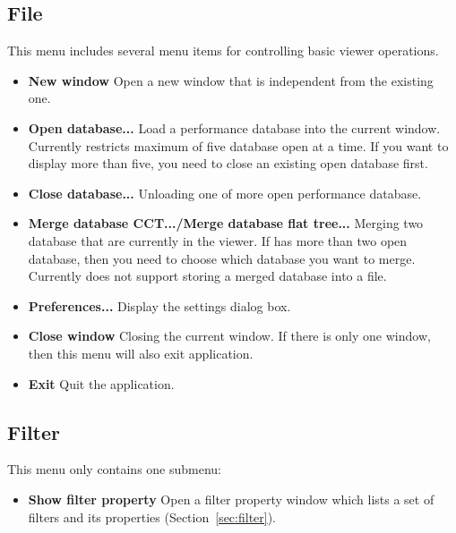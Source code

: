 \subsection{File}
This menu includes several menu items for controlling basic viewer operations.
\begin{itemize}
\item \textbf{New window}
  Open a new \hpcviewer{} window that is independent from the existing one.

\item \textbf{Open database...}
  Load a performance database into the current \hpcviewer{} window. 
Currently \hpcviewer{} restricts maximum of five database open at a time. 
If you want to display more than five, you need to close an existing open database first.

\item \textbf{Close database...}
  Unloading one of more open performance database.

\item \textbf{Merge database CCT.../Merge database flat tree...}
  Merging two database that are currently in the viewer. If \hpcviewer{} has more than two
open database, then you need to choose which database you want to merge.
Currently \hpcviewer{} does not support storing a merged database into a file.

\item \textbf{Preferences...}
  Display the settings dialog box.

\item \textbf{Close window}
  Closing the current window. If there is only one window, then this menu will also exit \hpcviewer{} application.

\item \textbf{Exit}
  Quit the \hpcviewer{} application.

\end{itemize}


\subsection{Filter}
This menu only contains one submenu:
\begin{itemize}
 \item \textbf{Show filter property}
  Open a filter property window which lists a set of filters and its properties (Section~\ref{sec:filter}).
\end{itemize}

